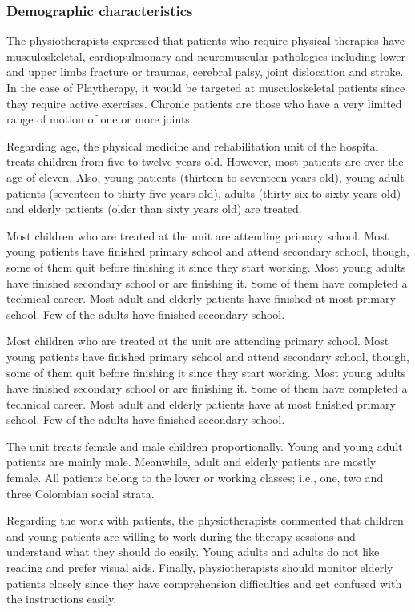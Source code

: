 \subsubsection{Demographic characteristics}
The physiotherapists expressed that patients who require physical therapies have musculoskeletal, cardiopulmonary and neuromuscular pathologies including lower and upper limbs fracture or traumas, cerebral palsy, joint dislocation and stroke. In the case of Playtherapy, it would be targeted at musculoskeletal patients since they require active exercises. Chronic patients are those who have a very limited range of motion of one or more joints.

Regarding age, the physical medicine and rehabilitation unit of the hospital treats children from five to twelve years old. However, most patients are over the age of eleven. Also, young patients (thirteen to seventeen years old), young adult patients (seventeen to thirty-five years old), adults (thirty-six to sixty years old) and elderly patients (older than sixty years old) are treated.

Most children who are treated at the unit are attending primary school. Most young patients have finished primary school and attend secondary school, though, some of them quit before finishing it since they start working. Most young adults have finished secondary school or are finishing it. Some of them have completed a technical career. Most adult and elderly patients have finished at most primary school. Few of the adults have finished secondary school.

Most children who are treated at the unit are attending primary school. Most young patients have finished primary school and attend secondary school, though, some of them quit before finishing it since they start working. Most young adults have finished secondary school or are finishing it. Some of them have completed a technical career. Most adult and elderly patients have at most finished primary school. Few of the adults have finished secondary school.

The unit treats female and male children proportionally. Young and young adult patients are mainly male. Meanwhile, adult and elderly patients are mostly female. All patients belong to the lower or working classes; i.e., one, two and three Colombian social strata.

Regarding the work with patients, the physiotherapists commented that children and young patients are willing to work during the therapy sessions and understand what they should do easily. Young adults and adults do not like reading and prefer visual aids. Finally, physiotherapists should monitor elderly patients closely since they have comprehension difficulties and get confused with the instructions easily.

